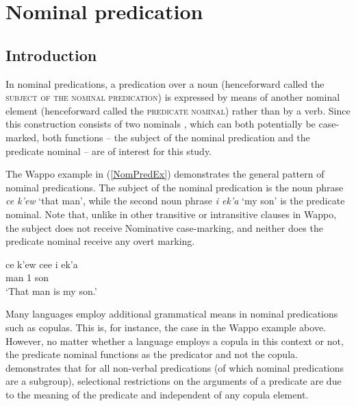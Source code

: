 \chapter{Nominal predication}\label{nompred}   



\section{Introduction}

In nominal predications, a predication over a noun (henceforward called the \textsc{subject of the nominal predication}) is expressed by means of another nominal element (henceforward called the \textsc{predicate nominal}) rather than by a verb. 
Since this construction consists of two nominals%
, which can both potentially be case-marked, both functions -- the subject of the nominal predication and the predicate nominal -- are of interest for this study. %

The Wappo example in (\ref{NomPredEx}) demonstrates the general pattern of nominal predications. 
The subject of the nominal predication is the noun phrase \emph{ce k'ew} `that man', while the second noun phrase \emph{i ek'a} `my son' is the predicate nominal. 
Note that, unlike in other transitive or intransitive clauses in Wappo, the subject does not receive Nominative case-marking, and neither does the predicate nominal receive any overt marking.


\begin{exe}\ex \label{NomPredEx}
\gll ce k'ew ce{\textglotstop}e{\textglotstop} i ek'a\\
     \dem{} man \cop{} 1\sg{} son\\
\glt	`That man is my son.'
\end{exe} 

Many languages employ additional grammatical means in nominal predications such as copulas. 
This is, for instance, the case in the Wappo example above. 
However, no matter whether a language employs a copula in this context or not, the predicate nominal functions as the predicator and not the copula. 
\citet[28--29]{Hengeveld:1992} demonstrates that for all non-verbal predications (of which nominal predications are a subgroup), selectional restrictions on the arguments of a predicate are due to the meaning of the predicate and independent of any copula element. 

